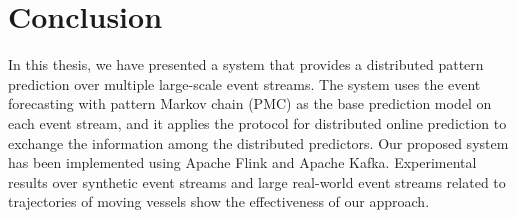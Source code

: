 %	
%	
%	
%	


\section{Conclusion}

\par In this thesis, we have presented a system that provides a distributed pattern prediction over multiple large-scale event streams. The system uses the event forecasting with pattern Markov chain (PMC) \cite{alevizos2017event} as the base prediction model on each event stream, and it applies the protocol for distributed online prediction \cite{kamp2014communication} to exchange the information among the distributed predictors.  Our proposed system has been implemented using Apache Flink and Apache Kafka. Experimental results over synthetic event streams and large real-world event streams related to trajectories of moving vessels show the effectiveness of our approach.